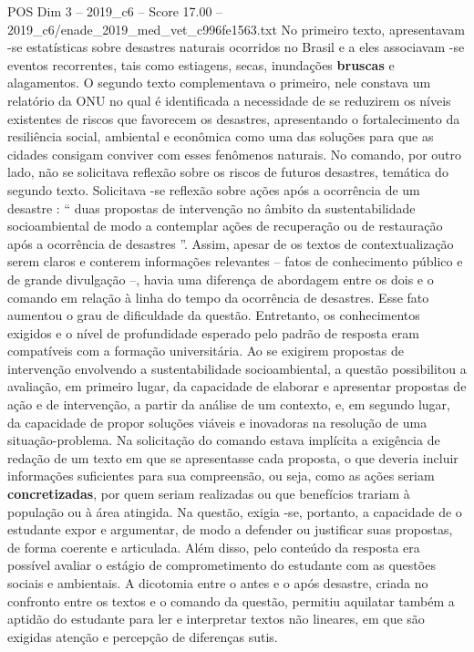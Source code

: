 \begin{textsample}{POS Dim 3 – 2019\_c6 – Score 17.00 – 2019\_c6/enade\_2019\_med\_vet\_c996fe1563.txt}
No primeiro texto, apresentavam -se estatísticas sobre desastres naturais ocorridos no Brasil e a eles associavam -se eventos recorrentes, tais como estiagens, secas, inundações \textbf{bruscas} e alagamentos.
O segundo texto complementava o primeiro, nele constava um relatório da ONU no qual é identificada a necessidade de se reduzirem os níveis existentes de riscos que favorecem os desastres, apresentando o fortalecimento da resiliência social, ambiental e econômica como uma das soluções para que as cidades consigam conviver com esses fenômenos naturais.
No comando, por outro lado, não se solicitava reflexão sobre os riscos de futuros desastres, temática do segundo texto.
Solicitava -se reflexão sobre ações após a ocorrência de um desastre : “ duas propostas de intervenção no âmbito da sustentabilidade socioambiental de modo a contemplar ações de recuperação ou de restauração após a ocorrência de desastres ”.
Assim, apesar de os textos de contextualização serem claros e conterem informações relevantes – fatos de conhecimento público e de grande divulgação –, havia uma diferença de abordagem entre os dois e o comando em relação à linha do tempo da ocorrência de desastres.
Esse fato aumentou o grau de dificuldade da questão.
Entretanto, os conhecimentos exigidos e o nível de profundidade esperado pelo padrão de resposta eram compatíveis com a formação universitária.
Ao se exigirem propostas de intervenção envolvendo a sustentabilidade socioambiental, a questão possibilitou a avaliação, em primeiro lugar, da capacidade de elaborar e apresentar propostas de ação e de intervenção, a partir da análise de um contexto, e, em segundo lugar, da capacidade de propor soluções viáveis e inovadoras na resolução de uma situação-problema.
Na solicitação do comando estava implícita a exigência de redação de um texto em que se apresentasse cada proposta, o que deveria incluir informações suficientes para sua compreensão, ou seja, como as ações seriam \textbf{concretizadas}, por quem seriam realizadas ou que benefícios trariam à população ou à área atingida.
Na questão, exigia -se, portanto, a capacidade de o estudante expor e argumentar, de modo a defender ou justificar suas propostas, de forma coerente e articulada.
Além disso, pelo conteúdo da resposta era possível avaliar o estágio de comprometimento do estudante com as questões sociais e ambientais.
A dicotomia entre o antes e o após desastre, criada no confronto entre os textos e o comando da questão, permitiu aquilatar também a aptidão do estudante para ler e interpretar textos não lineares, em que são exigidas atenção e percepção de diferenças sutis.

\end{textsample}

